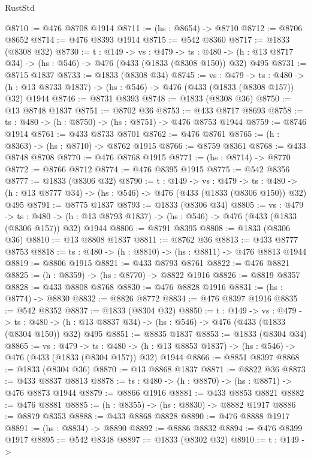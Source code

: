 \begin{lexlean}{RustStd}
\begin{coremodule}
@8710 := @476 @8708 @1914
@8711 := (hs : @8654) -> @8710
@8712 := @8706 @8652
@8714 := @476 @8393 @1914
@8715 := @542 @8360
@8717 := @1833 (@8308 @32)
@8730 := {t : @149} ->
  {vs : @479} ->
  {ts : @480} -> (h : @13 @8717 @34) -> (hs : @546) -> @476 (@433 (@1833 (@8308 @150)) @32) @495
@8731 := @8715 @1837
@8733 := @1833 (@8308 @34)
@8745 := {vs : @479} ->
  {ts : @480} -> (h : @13 @8733 @1837) -> (hs : @546) -> @476 (@433 (@1833 (@8308 @157)) @32) @1944
@8746 := @8731 @8393
@8748 := @1833 (@8308 @36)
@8750 := @13 @8748 @1837
@8751 := @8702 @36
@8753 := @433 @8717 @8693
@8758 := {ts : @480} -> (h : @8750) -> (hs : @8751) -> @476 @8753 @1944
@8759 := @8746 @1914
@8761 := @433 @8733 @8701
@8762 := @476 @8761
@8765 := (h : @8363) -> (hs : @8710) -> @8762 @1915
@8766 := @8759 @8361
@8768 := @433 @8748 @8708
@8770 := @476 @8768 @1915
@8771 := (hs : @8714) -> @8770
@8772 := @8766 @8712
@8774 := @476 @8395 @1915
@8775 := @542 @8356
@8777 := @1833 (@8306 @32)
@8790 := {t : @149} ->
  {vs : @479} ->
  {ts : @480} -> (h : @13 @8777 @34) -> (hs : @546) -> @476 (@433 (@1833 (@8306 @150)) @32) @495
@8791 := @8775 @1837
@8793 := @1833 (@8306 @34)
@8805 := {vs : @479} ->
  {ts : @480} -> (h : @13 @8793 @1837) -> (hs : @546) -> @476 (@433 (@1833 (@8306 @157)) @32) @1944
@8806 := @8791 @8395
@8808 := @1833 (@8306 @36)
@8810 := @13 @8808 @1837
@8811 := @8762 @36
@8813 := @433 @8777 @8753
@8818 := {ts : @480} -> (h : @8810) -> (hs : @8811) -> @476 @8813 @1944
@8819 := @8806 @1915
@8821 := @433 @8793 @8761
@8822 := @476 @8821
@8825 := (h : @8359) -> (hs : @8770) -> @8822 @1916
@8826 := @8819 @8357
@8828 := @433 @8808 @8768
@8830 := @476 @8828 @1916
@8831 := (hs : @8774) -> @8830
@8832 := @8826 @8772
@8834 := @476 @8397 @1916
@8835 := @542 @8352
@8837 := @1833 (@8304 @32)
@8850 := {t : @149} ->
  {vs : @479} ->
  {ts : @480} -> (h : @13 @8837 @34) -> (hs : @546) -> @476 (@433 (@1833 (@8304 @150)) @32) @495
@8851 := @8835 @1837
@8853 := @1833 (@8304 @34)
@8865 := {vs : @479} ->
  {ts : @480} -> (h : @13 @8853 @1837) -> (hs : @546) -> @476 (@433 (@1833 (@8304 @157)) @32) @1944
@8866 := @8851 @8397
@8868 := @1833 (@8304 @36)
@8870 := @13 @8868 @1837
@8871 := @8822 @36
@8873 := @433 @8837 @8813
@8878 := {ts : @480} -> (h : @8870) -> (hs : @8871) -> @476 @8873 @1944
@8879 := @8866 @1916
@8881 := @433 @8853 @8821
@8882 := @476 @8881
@8885 := (h : @8355) -> (hs : @8830) -> @8882 @1917
@8886 := @8879 @8353
@8888 := @433 @8868 @8828
@8890 := @476 @8888 @1917
@8891 := (hs : @8834) -> @8890
@8892 := @8886 @8832
@8894 := @476 @8399 @1917
@8895 := @542 @8348
@8897 := @1833 (@8302 @32)
@8910 := {t : @149} ->

\end{coremodule}
\end{lexlean}
